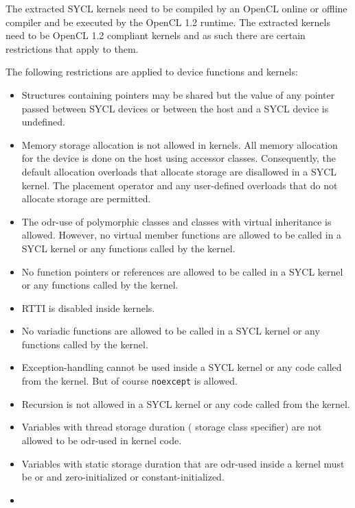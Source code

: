 The extracted SYCL kernels need to be compiled by an OpenCL online or offline
compiler and be executed by the OpenCL 1.2 runtime. The extracted kernels
need to be OpenCL 1.2 compliant kernels and as such there are certain
restrictions that apply to them.

The following restrictions are applied to device functions and kernels:

\begin{itemize}
  \item
    Structures containing pointers may be shared but the value of any pointer
    passed between SYCL devices or between the host and a SYCL device is
    undefined.
  \item
    Memory storage allocation is not allowed in kernels. All memory allocation
    for the device is done on the host using accessor classes.
    Consequently, the default allocation  overloads that
    allocate storage are disallowed in a SYCL kernel. The placement
     operator and any user-defined overloads that do not
    allocate storage are permitted.
  \item
    The odr-use of polymorphic classes and classes with virtual inheritance is allowed.
    However, no virtual member functions are allowed to be called in a SYCL kernel or any functions called by the kernel.
  \item
    No function pointers or references are allowed to be called in a SYCL kernel
    or any functions called by the kernel.
  \item
    RTTI is disabled inside kernels.
  \item
    No variadic functions are allowed to be called in
    a SYCL kernel or any functions called by the kernel.
  \item
    Exception-handling cannot be used inside a SYCL kernel or any
    code called from the kernel. But of course \lstinline{noexcept} is
    allowed.
  \item
    Recursion is not allowed in a SYCL kernel or any
    code called from the kernel.
  \item
    Variables with thread storage duration ( storage class specifier)
    are not allowed to be odr-used in kernel code.
  \item
    Variables with static storage duration that are odr-used inside a kernel
    must be  or  and zero-initialized or
    constant-initialized.
  \item

\end{itemize}
